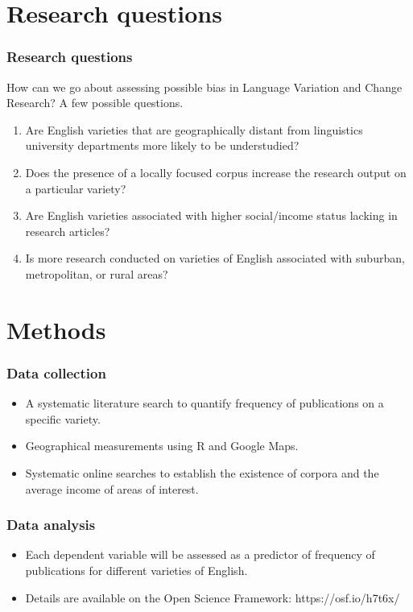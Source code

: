 \documentclass{beamer}
\begin{document}
\section{Research questions}
\begin{frame}
\frametitle{Research questions}
How can we go about assessing possible bias in Language Variation and Change Research? A few possible questions.
\begin{enumerate} 
		\item Are English varieties that are geographically distant from linguistics university departments more likely to be understudied? \label{geog}
		
		\item Does the presence of a locally focused corpus increase the research output on a particular variety?  \label{corpus}
		
		\item Are English varieties associated with higher social/income status lacking in research articles? \label{income}
		
		\item Is more research conducted on varieties of English associated with suburban, metropolitan, or rural areas? \label{suburban}
\end{enumerate}
\end{frame}


\section{Methods}
\begin{frame}
\frametitle{Data collection}
\begin{itemize}
\item A systematic literature search to quantify frequency of publications on a specific variety.
\item Geographical measurements using R and Google Maps.
\item Systematic online searches to establish the existence of corpora and the average income of areas of interest.
\end{itemize}
\end{frame}

\begin{frame}
\frametitle{Data analysis}
\begin{itemize}
\item Each dependent variable will be assessed as a predictor of frequency of publications for different varieties of English.
\item Details are available on the Open Science Framework: https://osf.io/h7t6x/
\end{itemize}
\end{frame}
\end{document}
